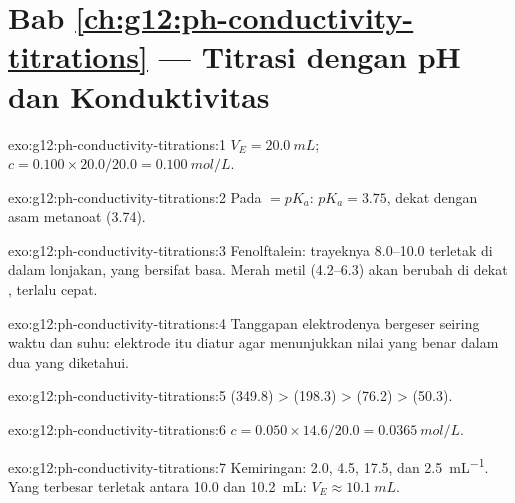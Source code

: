 \section*{Bab \ref{ch:g12:ph-conductivity-titrations} --- Titrasi dengan pH dan Konduktivitas}

\begin{solution}{exo:g12:ph-conductivity-titrations:1}
$V_E = \qty{20.0}{mL}$; $c = 0.100 \times 20.0 / 20.0 = \qty{0.100}{mol/L}$.
\end{solution}

\begin{solution}{exo:g12:ph-conductivity-titrations:2}
Pada   $= pK_a$: $pK_a = 3.75$, dekat dengan asam
metanoat (3.74).
\end{solution}

\begin{solution}{exo:g12:ph-conductivity-titrations:3}
Fenolftalein: trayeknya 8.0--10.0 terletak di dalam lonjakan, yang
bersifat basa. Merah metil (4.2--6.3) akan berubah di dekat , terlalu cepat.
\end{solution}

\begin{solution}{exo:g12:ph-conductivity-titrations:4}
Tanggapan elektrodenya bergeser seiring waktu dan suhu: elektrode itu
diatur agar menunjukkan nilai yang benar dalam dua 
yang  diketahui.
\end{solution}

\begin{solution}{exo:g12:ph-conductivity-titrations:5}
 (349.8) >  (198.3) >  (76.2) >  (50.3).
\end{solution}

\begin{solution}{exo:g12:ph-conductivity-titrations:6}
$c = 0.050 \times 14.6 / 20.0 = \qty{0.0365}{mol/L}$.
\end{solution}

\begin{solution}{exo:g12:ph-conductivity-titrations:7}
Kemiringan: 2.0, 4.5, 17.5, dan \qty{2.5}{mL^{-1}}. Yang terbesar
terletak antara 10.0 dan \qty{10.2}{mL}: $V_E \approx \qty{10.1}{mL}$.
\end{solution}

